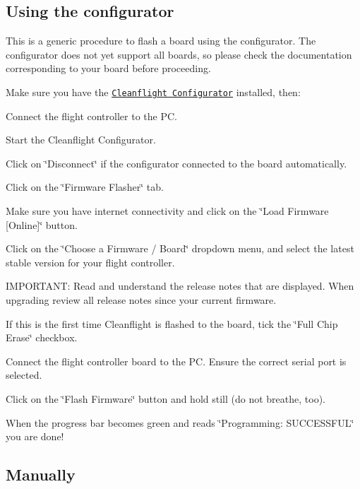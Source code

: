 \subsection*{Using the configurator}

This is a generic procedure to flash a board using the configurator. The configurator does not yet support all boards, so please check the documentation corresponding to your board before proceeding.

Make sure you have the \href{https://github.com/cleanflight/cleanflight-configurator}{\tt Cleanflight Configurator} installed, then\+:


\begin{DoxyItemize}
\item Connect the flight controller to the P\+C.
\item Start the Cleanflight Configurator.
\item Click on \char`\"{}\+Disconnect\char`\"{} if the configurator connected to the board automatically.
\item Click on the \char`\"{}\+Firmware Flasher\char`\"{} tab.
\item Make sure you have internet connectivity and click on the \char`\"{}\+Load Firmware \mbox{[}\+Online\mbox{]}\char`\"{} button.
\item Click on the \char`\"{}\+Choose a Firmware / Board\char`\"{} dropdown menu, and select the latest stable version for your flight controller.
\item I\+M\+P\+O\+R\+T\+A\+N\+T\+: Read and understand the release notes that are displayed. When upgrading review all release notes since your current firmware.
\item If this is the first time Cleanflight is flashed to the board, tick the \char`\"{}\+Full Chip Erase\char`\"{} checkbox.
\item Connect the flight controller board to the P\+C. Ensure the correct serial port is selected.
\item Click on the \char`\"{}\+Flash Firmware\char`\"{} button and hold still (do not breathe, too).
\item When the progress bar becomes green and reads \char`\"{}\+Programming\+: S\+U\+C\+C\+E\+S\+S\+F\+U\+L\char`\"{} you are done!
\end{DoxyItemize}

\subsection*{Manually}

